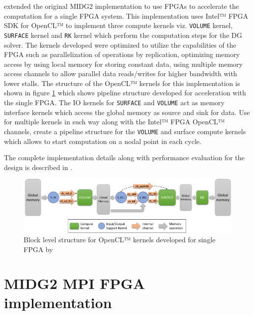 \textcite{kenter_opencl-based_2018} extended the original MIDG2 implementation to use
FPGAs to accelerate the computation for a single FPGA system. This implementation
uses Intel™ FPGA SDK for OpenCL™ to implement three compute kernels viz. \texttt{VOLUME} kernel,
\texttt{SURFACE} kernel and \texttt{RK} kernel which perform the computation steps for the \ac{DG} solver.
The kernels developed were optimized to utilize the capabilities of the FPGA such
as parallelization of operations by replication, optimizing memory access by using
local memory for storing constant data, using multiple memory access channels to allow parallel data
reads/writes for higher bandwidth with lower stalls.
The structure of the OpenCL™ kernels for this implementation is shown in figure  \ref{fig:singlefpga_kernstruc}
which shows pipeline structure developed for acceleration with the single FPGA.
The IO kernels for \texttt{SURFACE} and \texttt{VOLUME} act as memory interface kernels which
access the global memory as source and sink for data. Use for multiple
kernels in such way along with the Intel™ FPGA OpenCL™
channels, create a pipeline structure for the \texttt{VOLUME} and surface compute kernels
which allows to start computation on a nodal point in each cycle.

The complete implementation details along with performance evaluation for the design
is described in \cite{kenter_opencl-based_2018}.

\begin{figure}[ht]%
    \centering
    \includegraphics[width=1.0\textwidth]{images/nb_kernstruc}
    \caption{Block level structure for OpenCL™ kernels developed for single FPGA by \textcite{kenter_opencl-based_2018}}
    \label{fig:singlefpga_kernstruc}
\end{figure}


\section{MIDG2 MPI FPGA implementation}
\label{sec:midg2_mpi}

